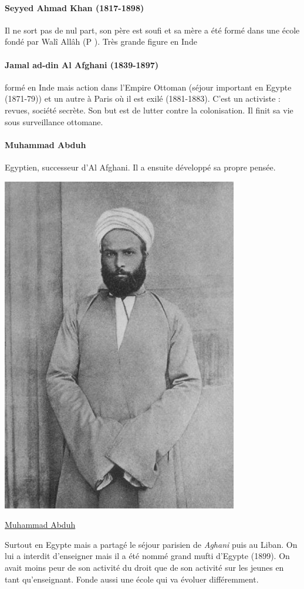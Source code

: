    \paragraph{Seyyed Ahmad Khan (1817-1898)} Il ne sort pas de nul part, son père est soufi et sa mère a été formé dans une école fondé par Walî Allâh (P \pageref{Theo:waliAllah}). Très grande figure en Inde
   
   \paragraph{Jamal ad-din Al Afghani (1839-1897)} formé en Inde mais action dans l'Empire Ottoman (séjour important en Egypte (1871-79)) et un autre à Paris où il est exilé (1881-1883). C'est un activiste  : revues, société secrète. Son but est de lutter contre la colonisation. Il finit sa vie sous surveillance ottomane.
   

  
   
    \paragraph{Muhammad Abduh} Egyptien, successeur d'Al Afghani. Il a ensuite développé sa propre pensée. 
    \begin{marginfigure}
       \centering
       \includegraphics[width=.7\textwidth]{CourantsIslamContemporain/ImagesCourantsIslamContemporain/390px-Muhammad_Abduh.jpg}
       \caption{\href{https://fr.wikipedia.org/wiki/Mohamed\_Abduh}{Muhammad Abduh}}
       \label{fig:my_label}
   \end{marginfigure}
   Surtout en Egypte mais a partagé le séjour parisien de \textit{Aghani} puis au Liban. On lui a interdit d'enseigner mais il a été nommé grand mufti d'Egypte (1899). On avait moins peur de son activité du droit que de son activité sur les jeunes en tant qu'enseignant. Fonde aussi une école qui va évoluer différemment.  
    
